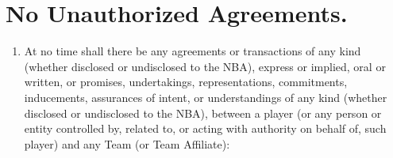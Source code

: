 \documentclass[
]{book}
\providecommand{\tightlist}{%
  \setlength{\itemsep}{0pt}\setlength{\parskip}{0pt}}
\begin{document}
\hypertarget{no-unauthorized-agreements.}{%
\section{No Unauthorized Agreements.}\label{no-unauthorized-agreements.}}

\begin{enumerate}
\def\labelenumi{(\alph{enumi})}
\tightlist
\item
  At no time shall there be any agreements or transactions of any kind (whether disclosed or undisclosed to the NBA), express or implied, oral or written, or promises, undertakings, representations, commitments, inducements, assurances of intent, or understandings of any kind (whether disclosed or undisclosed to the NBA), between a player (or any person or entity controlled by, related to, or acting with authority on behalf of, such player) and any Team (or Team Affiliate):


\end{enumerate}
\end{document}
